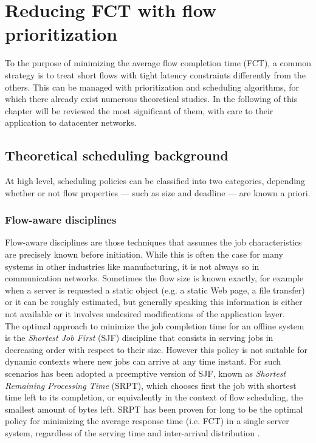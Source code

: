 \chapter{Reducing FCT with flow prioritization}
\label{ch:theoretical-scheduling-bg}
To the purpose of minimizing the average flow completion time (FCT), a common strategy is to treat short flows with tight latency constraints differently from the others. This can be managed with prioritization and scheduling algorithms, for which there already exist numerous theoretical studies. In the following of this chapter will be reviewed the most significant of them, with care to their application to datacenter networks. 

\section{Theoretical scheduling background}
At high level, scheduling policies can be classified into two categories, depending whether or not flow properties --- such as size and deadline --- are known a priori.

\subsection{Flow-aware disciplines}
Flow-aware disciplines are those techniques that assumes the job characteristics are precisely known before initiation. While this is often the case for many systems in other industries like manufacturing, it is not always so in communication networks. Sometimes the flow size is known exactly, for example when a server is requested a static object (e.g. a static Web page, a file transfer) or it can be roughly estimated, but generally speaking this information is either not available or it involves undesired modifications of the application layer. \\
The optimal approach to minimize the job completion time for an offline system is the \emph{Shortest Job First} (SJF) discipline that consists in serving jobs in decreasing order with respect to their size. However this policy is not suitable for dynamic contexts where new jobs can arrive at any time instant. For such scenarios has been adopted a preemptive version of SJF, known as \emph{Shortest Remaining Processing Time} (SRPT), which chooses first the job with shortest time left to its completion, or equivalently in the context of flow scheduling, the smallest amount of bytes left. SRPT has been proven for long to be the optimal policy for minimizing the average response time (i.e. FCT) in a single server system, regardless of the serving time and inter-arrival distribution \cite{schrage_1968}. 

